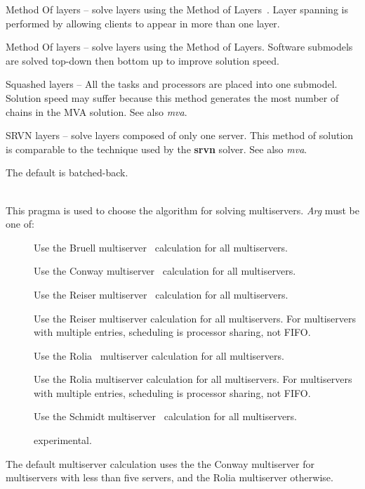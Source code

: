 \begin{description}
\begin{description}
Method Of layers -- solve layers using the Method of Layers~\cite{perf:rolia-95-ieeese-mol}. Layer spanning is performed by allowing clients to appear in more than one layer.
\item[\optarg{mol-back}{}]
Method Of layers -- solve layers using the Method of Layers.  Software submodels are solved top-down then bottom up to improve solution speed.
\item[\optarg{squashed}{}]
Squashed layers -- All the tasks and processors are placed into one submodel.
Solution speed may suffer because this method generates the most number of chains in the MVA solution.  See also \emph{mva}.
\item[\optarg{srvn}{}]
SRVN layers -- solve layers composed of only one server.
This method of solution is comparable to the technique used by the \textbf{srvn} solver.  See also \emph{mva}.
\end{description}
The default is batched-back.
\item[\optarg{multiserver}{=\emph{arg}}]~\\
This pragma is used to choose the algorithm for solving multiservers.
\emph{Arg} must be one of: 
\begin{description}
\item[]
Use the Bruell multiserver~\cite{queue:bruell-84-peva-load-dependent} calculation for all multiservers.
\item[]
Use the Conway multiserver~\cite{queue:deSouzaeSilva-87,queue:conway-88} calculation for all multiservers.
\item[]
Use the Reiser multiserver~\cite{queue:reiser-79} calculation for all multiservers.
\item[]
Use the Reiser multiserver calculation for all multiservers. For multiservers with multiple entries, scheduling is processor sharing, not FIFO. 
\item[]
Use the Rolia~\cite{perf:rolia-92,perf:rolia-95-ieeese-mol} multiserver calculation for all multiservers.
\item[]
Use the Rolia multiserver calculation for all multiservers. For multiservers with multiple entries, scheduling is processor sharing, not FIFO. 
\item[]
Use the Schmidt multiserver~\cite{queue:schmidt-97} calculation for all multiservers.
\item[]
experimental.
\end{description}
The default multiserver calculation uses the the Conway multiserver for multiservers with less than five servers, and the Rolia multiserver otherwise.


\end{description}
